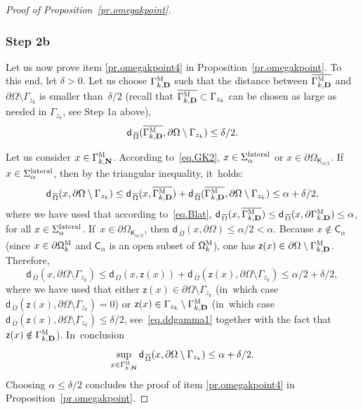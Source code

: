 \documentclass[10pt]{amsart}
\newcommand{\mbf}[1]{\mathbf{#1}}
\let\pa\partial
\theoremstyle{plain}
\theoremstyle{definition}
\begin{document}
\begin{proof}[Proof of Proposition~\ref{pr.omegakpoint}]
\subsubsection*{Step 2b}
Let us now prove item \eqref{pr.omegakpoint4} in Proposition~\ref{pr.omegakpoint}. To this end, let $\delta>0$. Let us choose $\Gamma_{k,\mbf D}^{\textsc{M}} $ such that the distance between $ \overline{\Gamma_{k,\mbf D}^{\textsc{M}} }$ and $\partial \Omega \setminus \Gamma_{z_k}$ is smaller than~$\delta/2$ (recall that $\overline{ \Gamma_{k,\mbf D}^{\textsc{M}} }\subset \Gamma_{z_k}$ can be chosen as large as needed in $\Gamma_{z_k}$, see Step 1a above),~\ie
\begin{equation}\label{eq.ddgamma1}
\mathsf d_{\, \overline \Omega}(\overline{\Gamma_{k,\mbf D}^{\textsc{M}} }, \partial \Omega \setminus \Gamma_{z_k})\le \delta/2.
\end{equation}

Let us consider $x\in \Gamma_{k,\mbf N}^{\textsc{M}}$. According to~\eqref{eq.GK2}, $x\in \Sigma_\alpha^{\textup{lateral}}$ or $x\in \partial \Omega_{\mathsf K_{\alpha/2}}$. If~$x\in \Sigma_\alpha^{\textup{lateral}}$, then by the triangular inequality, it~holds:
\[
\mathsf d_{\, \overline \Omega}(x, \partial \Omega \setminus \Gamma_{z_k}) \le \mathsf d_{\, \overline \Omega}(x, \overline{\Gamma_{k,\mbf D}^{\textsc{M}} }) +\mathsf d_{\, \overline \Omega}(\overline{\Gamma_{k,\mbf D}^{\textsc{M}} }, \partial \Omega \setminus \Gamma_{z_k})\le \alpha+\delta/2,
\]
where we have used that according to~\eqref{eq.Blat}, $\mathsf d_{\, \overline \Omega}(x, \overline{\Gamma_{k,\mbf D}^{\textsc{M}} })\le \mathsf d_{\, \overline \Omega}(x, \pa{\Gamma_{k,\mbf D}^{\textsc{M}} })\le \alpha$, for all $x\in \Sigma_\alpha^{\textup{lateral}}$. If~$x\in \partial \Omega_{\mathsf K_{\alpha/2}} $, then $ \mathsf d_{\, \overline \Omega}(x,\partial \Omega)\le \alpha/2<\alpha$.
Because $x\notin \mathsf C_\alpha$ (since $x\in \pa \mathsf \Omega_k^{\textsc{M}}$ and $\mathsf C_\alpha$ is an open subset of $\mathsf \Omega_k^{\textsc{M}}$), one has $\mathsf z(x)\in \partial \Omega\setminus \Gamma_{k,\mbf D}^{\textsc{M}} $. Therefore,
\[
\mathsf d_{\, \overline \Omega}(x, \partial \Omega \setminus \Gamma_{z_k})\le \mathsf d_{\, \overline \Omega}(x,\mathsf z(x))+\mathsf d_{\, \overline \Omega}(\mathsf z(x),\partial \Omega \setminus \Gamma_{z_k})\le \alpha/2 + \delta/2,
\]
where we have used that either $\mathsf z(x)\in \partial \Omega\setminus \Gamma_{z_k}$ (in~which case $\mathsf d_{\, \overline \Omega}(\mathsf z(x),\partial \Omega \setminus \Gamma_{z_k})=0$) or $\mathsf z(x)\in \Gamma_{z_k}\setminus \Gamma_{k,\mbf D}^{\textsc{M}} $ (in~which case $\mathsf d_{\, \overline \Omega}(\mathsf z(x),\partial \Omega \setminus \Gamma_{z_k})\le \delta/2$, see~\eqref{eq.ddgamma1} together with the fact that $\mathsf z(x)\notin \Gamma_{k,\mbf D}^{\textsc{M}} $). In~conclusion
\[
\sup_{x\in \Gamma_{k,\mbf N}^{\textsc{M}}}\mathsf d_{\, \overline \Omega}(x, \partial \Omega \setminus \Gamma_{z_k})\le \alpha+\delta/2.
\]
Choosing $\alpha\le \delta/2$ concludes the proof of item \eqref{pr.omegakpoint4} in Proposition~\ref{pr.omegakpoint}.


\end{proof}
\end{document}
